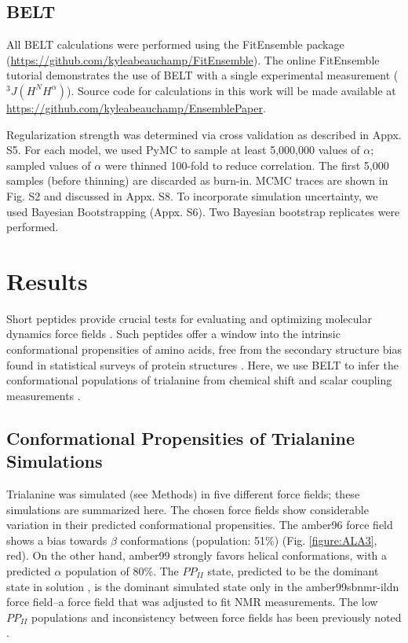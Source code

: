 \documentclass[11pt,titlepage]{article}
\begin{document}
\subsection*{BELT}

All BELT calculations were performed using the FitEnsemble package (\url{https://github.com/kyleabeauchamp/FitEnsemble}).  The online FitEnsemble tutorial demonstrates the use of BELT with a single experimental measurement ($^3J(H^N H^\alpha)$).  Source code for calculations in this work will be made available at \url{https://github.com/kyleabeauchamp/EnsemblePaper}.  

Regularization strength was determined via cross validation as described in Appx. S5.  For each model, we used PyMC to sample at least 5,000,000 values of $\alpha$; sampled values of $\alpha$ were thinned 100-fold to reduce correlation.  The first 5,000 samples (before thinning) are discarded as burn-in.  MCMC traces are shown in Fig. S2 and discussed in Appx. S8.  To incorporate simulation uncertainty, we used Bayesian Bootstrapping (Appx. S6).  Two Bayesian bootstrap replicates were performed.  

\section*{Results}

Short peptides provide crucial tests for evaluating and optimizing molecular dynamics force fields  \citep{Graf2007,beauchamp2012protein, nerenberg2011, best2008, Grdadolnik2011}.  Such peptides offer a window into the intrinsic conformational propensities of amino acids, free from the secondary structure bias found in statistical surveys of protein structures  \citep{Jha2005}.  Here, we use BELT to infer the conformational populations of trialanine from chemical shift and scalar coupling measurements  \citep{Graf2007}.  


\subsection*{Conformational Propensities of Trialanine Simulations}

Trialanine was simulated (see Methods) in five different force fields; these simulations are summarized here.  The chosen force fields show considerable variation in their predicted conformational propensities.  The amber96 force field shows a bias towards $\beta$ conformations (population: 51\%) (Fig. \ref{figure:ALA3}, red).  On the other hand, amber99 strongly favors helical conformations, with a predicted $\alpha$ population of 80\%.  The $PP_{II}$ state, predicted to be the dominant state in solution \citep{Grdadolnik2011, Graf2007, Avbelj2006}, is the dominant simulated state only in the amber99sbnmr-ildn force field--a force field that was adjusted to fit NMR measurements.  The low $PP_{II}$ populations and inconsistency between force fields has been previously noted \citep{Graf2007, beauchamp2012protein, nerenberg2011, best2008}.  
\end{document}
